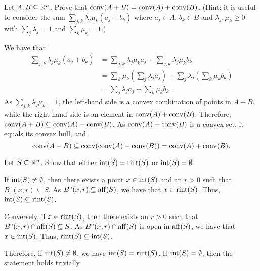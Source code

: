 \begin{exercise}
  Let $A, B \subseteq \mathbb{R}^n$.
  Prove that $\operatorname*{conv}(A + B) = \operatorname*{conv}(A) + \operatorname*{conv}(B)$.
  (Hint: it is useful to consider the sum $\sum_{j,k} \lambda_j \mu_k (a_j + b_k)$ where $a_j \in A$, $b_k \in B$ and $\lambda_j, \mu_k \geq 0$ with $\sum_j \lambda_j = 1$ and $\sum_k \mu_k = 1$.)
\end{exercise}

\begin{solution}
  We have that
  \begin{align*}
    \sum_{j,k} \lambda_j \mu_k (a_j + b_k)
    &= \sum_{j,k} \lambda_j \mu_k a_j + \sum_{j,k} \lambda_j \mu_k b_k \\
    &= \sum_k \mu_k \left( \sum_j \lambda_j a_j \right) + \sum_j \lambda_j \left( \sum_k \mu_k b_k \right) \\
    &= \sum_j \lambda_j a_j + \sum_k \mu_k b_k.
  \end{align*}
  As $\sum_{j,k} \lambda_j \mu_k = 1$, the left-hand side is a convex combination of points in $A + B$, while the right-hand side is an element in $\operatorname*{conv}(A) + \operatorname*{conv}(B)$.
  Therefore, $\operatorname*{conv}(A + B) \subseteq \operatorname*{conv}(A) + \operatorname*{conv}(B)$.
  As $\operatorname*{conv}(A) + \operatorname*{conv}(B)$ is a convex set, it equals its convex hull, and
  \begin{equation}
    \operatorname*{conv}(A + B) \subseteq \operatorname*{conv}(\operatorname*{conv}(A) + \operatorname*{conv}(B)) = \operatorname*{conv}(A) + \operatorname*{conv}(B).
  \end{equation}
\end{solution}


\begin{exercise}\label{ex:intr_equals_rint}
  Let $S \subseteq \mathbb{R}^n$.
  Show that either $\operatorname*{int}(S) = \operatorname*{rint}(S)$ or $\operatorname*{int}(S) = \emptyset$.
\end{exercise}

\begin{solution}
  If $\operatorname*{int}(S) \neq \emptyset$, then there exists a point $x \in \operatorname*{int}(S)$ and an $r > 0$ such that $B^\circ(x, r) \subseteq S$.
  As $B^\circ(x, r) \subseteq \operatorname*{aff}(S)$, we have that $x \in \operatorname*{rint}(S)$.
  Thus, $\operatorname*{int}(S) \subseteq \operatorname*{rint}(S)$.

  Conversely, if $x \in \operatorname*{rint}(S)$, then there exists an $r > 0$ such that $B^\circ(x, r) \cap \operatorname*{aff}(S) \subseteq S$.
  As $B^\circ(x, r) \cap \operatorname*{aff}(S)$ is open in $\operatorname*{aff}(S)$, we have that $x \in \operatorname*{int}(S)$.
  Thus, $\operatorname*{rint}(S) \subseteq \operatorname*{int}(S)$.

  Therefore, if $\operatorname*{int}(S) \neq \emptyset$, we have $\operatorname*{int}(S) = \operatorname*{rint}(S)$.
  If $\operatorname*{int}(S) = \emptyset$, then the statement holds trivially.
\end{solution}

